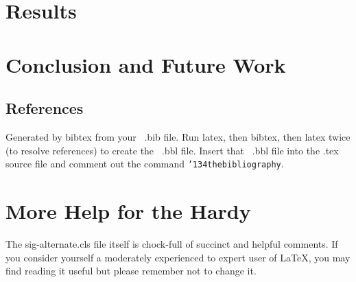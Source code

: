 \documentclass[10pt]{sigplanconf}
\begin{document}
\section{Results}
\section{Conclusion and Future Work}

\subsection{References}
{}


Generated by bibtex from your ~.bib file.  Run latex,
then bibtex, then latex twice (to resolve references)
to create the ~.bbl file.  Insert that ~.bbl file into
the .tex source file and comment out
the command \texttt{{\char'134}thebibliography}.
\section{More Help for the Hardy}
The sig-alternate.cls file itself is chock-full of succinct
and helpful comments.  If you consider yourself a moderately
experienced to expert user of \LaTeX, you may find reading
it useful but please remember not to change it.
\end{document}
